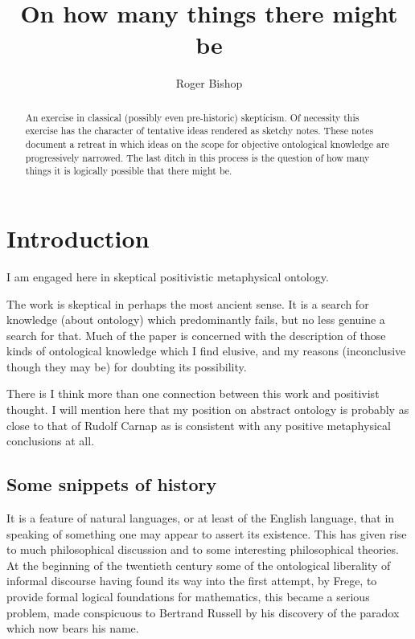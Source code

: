 \documentclass{rbjk}
\begin{document}
                                                                                   
\begin{article}
\begin{opening}  
\title{On how many things there might be}
\author{Roger Bishop }

\begin{abstract}
An exercise in classical (possibly even pre-historic) skepticism.
Of necessity this exercise has the character of tentative ideas rendered as sketchy notes.
These notes document a retreat in which ideas on the scope for objective ontological knowledge are progressively narrowed.
The last ditch in this process is the question of how many things it is logically possible that there might be.
\end{abstract}
\end{opening}

{\it \tableofcontents}

\section{Introduction}

I am engaged here in skeptical positivistic metaphysical ontology.

The work is skeptical in perhaps the most ancient sense.
It is a search for knowledge (about ontology) which predominantly fails, but no less genuine a search for that.
Much of the paper is concerned with the description of those kinds of ontological knowledge which I find elusive, and my reasons (inconclusive though they may be) for doubting its possibility.

There is I think more than one connection between this work and positivist thought.
I will mention here that my position on abstract ontology is probably as close to that of Rudolf Carnap as is consistent with any positive metaphysical conclusions at all.

\subsection{Some snippets of history}

It is a feature of natural languages, or at least of the English language, that in speaking of something one may appear to assert its existence.
This has given rise to much philosophical discussion and to some interesting philosophical theories.
At the beginning of the twentieth century some of the ontological liberality of informal discourse having found its way into the first attempt, by Frege, to provide formal logical foundations for mathematics, this became a serious problem, made conspicuous to Bertrand Russell by his discovery of the paradox which now bears his name.


\end{article}
\end{document}
